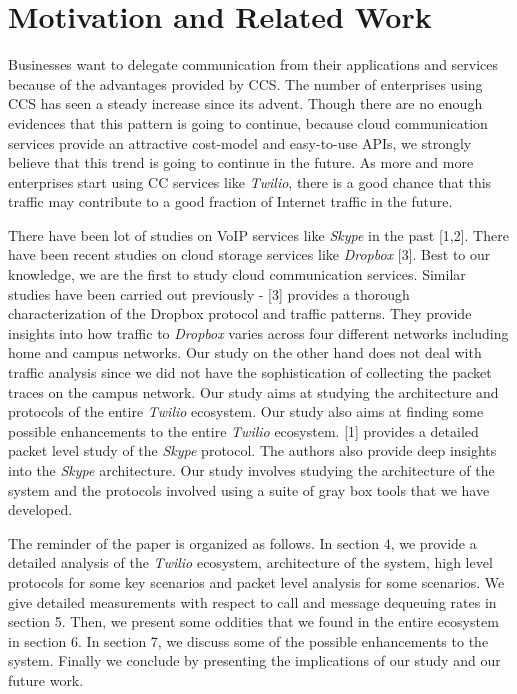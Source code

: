 \section{Motivation and Related Work}
\label{sec-motivationandrelated}
Businesses want to delegate communication from their applications and services because of the advantages provided by CCS. The number of enterprises using CCS has seen a steady increase since its advent. Though there are no enough evidences that this pattern is going to continue, because cloud communication services provide an attractive cost-model and easy-to-use APIs, we strongly believe that this trend is going to continue in the future. As more and more enterprises start using CC services like \textit{Twilio}, there is a good chance that this traffic may contribute to a good fraction of Internet traffic in the future. \par
There have been lot of studies on VoIP services like \textit{Skype} in the past [1,2]. There have been recent studies on cloud storage services like \textit{Dropbox} [3]. Best to our knowledge, we are the first to study cloud communication services. Similar studies have been carried out previously - [3] provides a thorough characterization of the Dropbox protocol and traffic patterns. They provide insights into how traffic to \textit{Dropbox} varies across four different networks including home and campus networks. Our study on the other hand does not deal with traffic analysis since we did not have the sophistication of collecting the packet traces on the campus network. Our study aims at studying the architecture and protocols of the entire \textit{Twilio} ecosystem. Our study also aims at finding some possible enhancements to the entire \textit{Twilio} ecosystem. [1] provides a detailed packet level study of the \textit{Skype} protocol. The authors also provide deep insights into the \textit{Skype} architecture. Our study involves studying the architecture of the system and the protocols involved using a suite of gray box tools that we have developed. \par
The reminder of the paper is organized as follows. In section 4, we provide a detailed analysis of the \textit{Twilio} ecosystem, architecture of the system, high level protocols for some key scenarios and packet level analysis for some scenarios. We give detailed measurements with respect to call and message dequeuing rates in section 5. Then, we present some oddities that we found in the entire ecosystem in section 6. In section 7, we discuss some of the possible enhancements to the system. Finally we conclude by presenting the implications of our study and our future work.